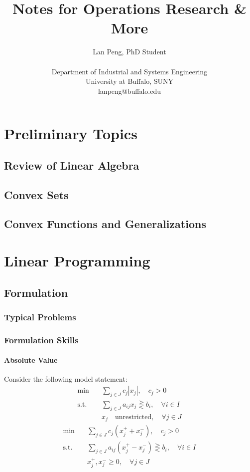 \documentclass[10pt]{book}
\author{Lan Peng, PhD Student\\ \\Department of Industrial and Systems Engineering\\University at Buffalo, SUNY\\lanpeng@buffalo.edu}
\title{Notes for Operations Research \& More}
\begin{document}
	\maketitle
	\tableofcontents

	\part{Preliminary Topics}
		\chapter{Review of Linear Algebra}

		\chapter{Convex Sets}

		\chapter{Convex Functions and Generalizations}

	\part{Linear Programming}
		\chapter{Formulation}
			\section{Typical Problems}

			\section{Formulation Skills}
				\subsection{Absolute Value}
					Consider the following model statement:
					\begin{align}
						\min \quad & \sum_{j\in J}c_j|x_j|, \quad c_j > 0 \nonumber\\
						\text{s.t.} \quad & \sum_{j\in J}a_{ij}x_j \gtreqless b_i, \quad \forall i\in I \nonumber\\
						                  & x_j \quad \text{unrestricted}, \quad \forall j\in J \nonumber
					\end{align}
					\begin{align}
						\min \quad & \sum_{j\in J}c_j(x_j^+ + x_j^-), \quad c_j > 0 \nonumber\\
						\text{s.t.} \quad & \sum_{j\in J}a_{ij}(x_j^+ - x_j^-) \gtreqless b_i, \quad \forall i\in I \nonumber\\
						                  & x_j^+, x_j^- \ge 0, \quad \forall j\in J \nonumber
					\end{align}
\end{document}
